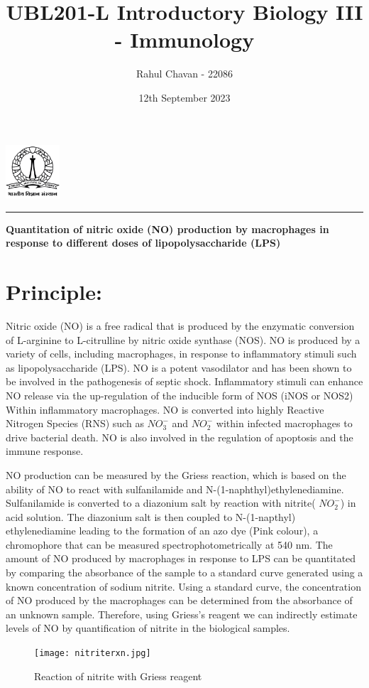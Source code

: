 \documentclass{report}
\title{\textbf{UBL201-L Introductory Biology III - Immunology}}
\author{Rahul Chavan - 22086}
\date{12th September 2023}
\renewcommand{\maketitle}{
 \begin{center}
    \includegraphics[width=2cm]{IISc_Master_Seal_Black.jpg}
    \vspace{0.5cm}

    \Large
    \textbf{\thetitle}
    
    \vspace{0.5cm}
    
    \Large
    \theauthor
    
    \vspace{0.2cm}
    
    \large
    \thedate

    \vspace{0.5cm}

    \hrule  
    
  \end{center}
}
\begin{document}
\maketitle
\begin{center}
    \large
    \textbf{Quantitation of nitric oxide (NO) production by macrophages
in response to different doses of lipopolysaccharide (LPS)}
\end{center} 







\section*{Principle:} 
Nitric oxide (NO) is a free radical that is produced by the enzymatic conversion of L-arginine to L-citrulline by nitric oxide synthase (NOS).
NO is produced by a variety of cells, including macrophages, in response to inflammatory stimuli such as lipopolysaccharide (LPS).
NO is a potent vasodilator and has been shown to be involved in the pathogenesis of septic shock. Inflammatory stimuli can enhance NO
release via the up-regulation of the inducible form of NOS (iNOS or NOS2) Within inflammatory macrophages.
NO is converted into highly Reactive Nitrogen Species (RNS) such as $NO_{3}^{-}$ and $NO_{2}^{-}$ within infected macrophages
to drive bacterial death. NO is also involved in the regulation of apoptosis and the immune response.


NO production can be measured by the Griess reaction, which is based on the ability of NO to react with sulfanilamide 
and N-(1-naphthyl)ethylenediamine. Sulfanilamide is converted to a diazonium salt by reaction with nitrite( $NO_{2}^{-}$) in acid solution. The diazonium salt 
is then coupled to N-(1-napthyl) ethylenediamine leading to the formation of an azo dye (Pink colour), a chromophore 
that can be measured spectrophotometrically at 540 nm.
The amount of NO produced by macrophages in response to LPS can be quantitated by comparing the absorbance of the sample to a standard curve generated using a known concentration of sodium nitrite.
Using a standard curve, the concentration of NO produced by the macrophages can be determined from the absorbance of an 
unknown sample.
Therefore, using Griess's reagent we can indirectly estimate levels of NO by quantification of nitrite in the biological samples.
 \begin{figure}[htbp]  
   \centering 
   \texttt{[image: nitriterxn.jpg]} 
   \caption{Reaction of nitrite with Griess reagent}
   \label{fig: Reaction } 
 \end{figure}
\end{document}
